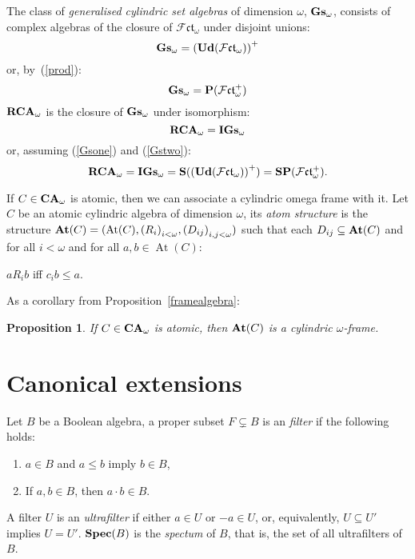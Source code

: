\documentclass{article}
\theoremstyle{defin}
\theoremstyle{theorem}
\theoremstyle{claim}
\theoremstyle{prop}
\newtheorem{prop}{Proposition}
\theoremstyle{lemma}
\theoremstyle{fact}
\theoremstyle{remark}
\theoremstyle{ex}
\theoremstyle{col}
\theoremstyle{question}
\begin{document}
The class of \emph{generalised cylindric set algebras} of dimension $\omega$, ${\bf Gs}_{\omega}$, 
consists of complex algebras of the closure of $\mathcal{F}\mathfrak{ct}_{\omega}$ under disjoint unions:
\begin{equation} \label{Gsone}
{\bf Gs}_{\omega} = {({\bf Ud}(\mathcal{F}\mathfrak{ct}_{\omega}))}^{+}
\end{equation}
or, by~(\ref{prod}):
\begin{equation} \label{Gstwo}
{\bf Gs}_{\omega} = {\bf P} (\mathcal{F}\mathfrak{ct}_{\omega}^{+})
\end{equation}
${\bf RCA}_{\omega}$ is the closure of ${\bf Gs}_{\omega}$ under isomorphism:
\begin{equation}
{\bf RCA}_{\omega} = {\bf IGs}_{\omega}
\end{equation}
or, assuming (\ref{Gsone}) and (\ref{Gstwo}):
\begin{equation}
{\bf RCA}_{\omega} = {\bf IGs}_{\omega} = {\bf S} ({({\bf Ud} (\mathcal{F}\mathfrak{ct}_{\omega}))}^{+}) = {\bf S} {\bf P} (\mathcal{F}\mathfrak{ct}_{\omega}^{+}).
\end{equation}

\vspace{\baselineskip}

If $C \in {\bf CA}_{\omega}$ is atomic, then we can associate a cylindric omega frame with it. 
Let $C$ be an atomic cylindric algebra of dimension $\omega$, its \emph{atom structure} 
is the structure ${\bf At}(C) = (\operatorname{At}(C), {(R_i)}_{i < \omega}, {(D_{ij})}_{i, j < \omega})$ 
such that each $D_{ij} \subseteq {\bf At}(C)$ and for all $i < \omega$ and 
for all $a, b \in \operatorname{At}(C)$:
\begin{center}
$a R_i b$ iff $c_i b \leq a$.
\end{center}

As a corollary from Proposition~\ref{framealgebra}:

\begin{prop}
If $C \in {\bf CA}_{\omega}$ is atomic, then ${\bf At}(C)$ is a cylindric $\omega$-frame.
\end{prop}

\section{Canonical extensions}

Let $B$ be a Boolean algebra, a proper subset $F \subsetneq B$ is an \emph{filter} if the following holds:
\begin{enumerate}
\item $a \in B$ and $a \leq b$ imply $b \in B$,
\item If $a, b \in B$, then $a \cdot b \in B$.
\end{enumerate}
A filter $U$ is an \emph{ultrafilter} if either $a \in U$ or $- a \in U$, or, equivalently, 
$U \subseteq U'$ implies $U = U'$. ${\bf Spec}(B)$ is the \emph{spectum} of $B$, 
that is, the set of all ultrafilters of $B$.
\end{document}
